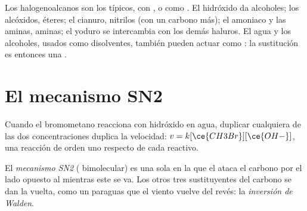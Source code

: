 Los halogenoalcanos son los  típicos, con ,  o
 como . El hidróxido da alcoholes; los alcóxidos,
éteres; el cianuro, nitrilos (con un carbono más); el amoniaco y las
aminas, aminas; el yoduro se intercambia con los demás haluros. El agua y
los alcoholes, usados como disolventes, también pueden actuar como
: la sustitución es entonces una .

\section{El mecanismo SN2}

Cuando el bromometano reacciona con hidróxido en agua, duplicar
cualquiera de las dos concentraciones duplica la velocidad:
$v = k[\ce{CH3Br}][\ce{OH-}]$, una reacción de orden uno respecto de cada
reactivo.

\begin{definition}\label{def:b1:nucleophilic-substitution:sn2}
El \emph{mecanismo SN2} (
bimolecular) es una sola  en la que el  ataca el
carbono por el lado opuesto al  mientras este se va. Los
otros tres sustituyentes del carbono se dan la vuelta, como un paraguas
que el viento vuelve del revés: la \emph{inversión de
Walden}.
\end{definition}

